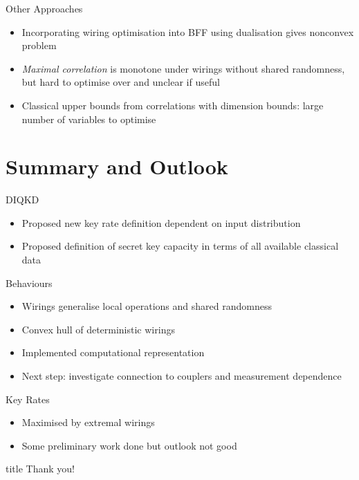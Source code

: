 \documentclass[xcolor=dvipsnames]{beamer}
\newcommand{\?}{\mathrel{?}} %
\begin{document}
\begin{frame}{Other Approaches}
  \begin{itemize}[<+->]
    \item Incorporating wiring optimisation into BFF using dualisation gives nonconvex problem
    \item \emph{Maximal correlation} is monotone under wirings without shared randomness, but hard to optimise over and unclear if useful
    \item Classical upper bounds from correlations with dimension bounds: large number of variables to optimise
  \end{itemize}
\end{frame}

\section*{Summary and Outlook}

\begin{frame}{DIQKD}
  \begin{itemize}[<+->]
    \item Proposed new key rate definition dependent on input distribution
    \item Proposed definition of secret key capacity in terms of all available classical data
  \end{itemize}
\end{frame}

\begin{frame}{Behaviours}
  \begin{itemize}[<+->]
    \item Wirings generalise local operations and shared randomness
    \item Convex hull of deterministic wirings
    \item Implemented computational representation
    \item Next step: investigate connection to couplers and measurement dependence
  \end{itemize}
\end{frame}

\begin{frame}{Key Rates}
  \begin{itemize}[<+->]
    \item Maximised by extremal wirings
    \item Some preliminary work done but outlook not good
  \end{itemize}
\end{frame}

\begin{frame}[c]{}
  \begin{center}
    \begin{beamercolorbox}[sep=8pt,center,shadow=true,rounded=true]{title}
      Thank you!
    \end{beamercolorbox}
  \end{center}
\end{frame}

\end{document}
